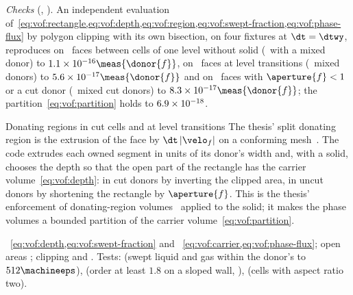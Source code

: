 \emph{Checks} (, ). An
independent evaluation of~\cref{eq:vof:rectangle,eq:vof:depth,eq:vof:region,eq:vof:swept-fraction,eq:vof:phase-flux}
by polygon clipping with its own bisection, on four fixtures at $\dt=\dtwy$,
reproduces  on \chkVofFluxUniformFaces\ faces between cells
of one level without solid (\chkVofFluxUniformMixed\ with a mixed donor) to
$\chkVofFluxUniformDiff\meas{\donor{f}}$, on \chkVofFluxCoarseFaces\ faces at
level transitions (\chkVofFluxCoarseMixed\ mixed donors) to
$\chkVofFluxCoarseDiff\meas{\donor{f}}$ and on \chkVofFluxCutFaces\ faces with
$\aperture{f}<1$ or a cut donor (\chkVofFluxCutMixed\ mixed cut donors) to
$\chkVofFluxCutDiff\meas{\donor{f}}$; the partition~\cref{eq:vof:partition}
holds to $6.9\times10^{-18}$.

\begin{deviation}{Donating regions in cut cells and at level transitions}
The thesis' split donating region is the extrusion of the face by
$\dt\abs{\velo_f}$ on a conforming mesh~. The code
extrudes each owned segment in units of its donor's width and, with a solid,
chooses the depth so that the open part of the rectangle has the carrier
volume~\cref{eq:vof:depth}: in cut donors by inverting the clipped area, in
uncut donors by shortening the rectangle by $\aperture{f}$. This is the
thesis' enforcement of donating-region volumes~ applied to
the solid; it makes the phase volumes a bounded partition of the carrier
volume~\cref{eq:vof:partition}.
\end{deviation}

\begin{implnote}
~\cref{eq:vof:depth,eq:vof:swept-fraction}
and ~\cref{eq:vof:carrier,eq:vof:phase-flux};
open areas ; clipping
 and
. Tests:
(swept liquid and gas within the donor's to $512\machineeps$),
(order at least $1.8$ on a sloped wall, ),
(cells with aspect ratio two).
\end{implnote}

